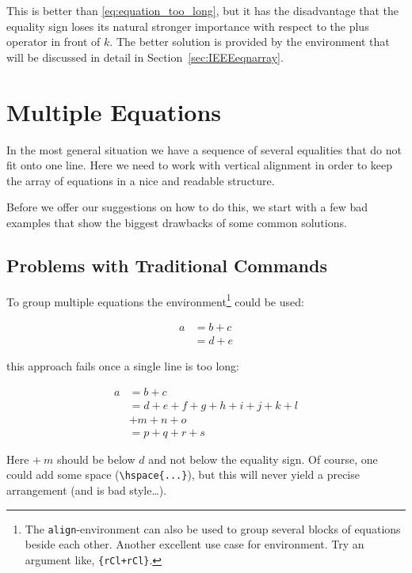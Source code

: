 This is better than \eqref{eq:equation_too_long}, but
it has the disadvantage that the equality sign loses its natural
stronger importance with respect to the plus operator in front of
$k$. The better solution is provided by the
 environment that will be discussed in detail in
Section~\ref{sec:IEEEeqnarray}.

\section{Multiple Equations}
\label{sec:IEEEeqnarray}

In the most general situation we have a sequence of several
equalities that do not fit onto one line. Here we need to work with
vertical alignment in order to keep the array of equations in a nice
and readable structure.

Before we offer our suggestions on how to do this, we start with a few
bad examples that show the biggest drawbacks of some common solutions.


\subsection{Problems with Traditional Commands}
\label{sec:problems_traditional}

To group multiple equations the
 environment\footnote{The \texttt{align}-environment can
  also be used to group several blocks of equations beside each other.
  Another excellent use case for
   environment. Try an argument like,
  \texttt{\{rCl+rCl\}}.} could be used:
\begin{example}
\begin{align}
  a & = b + c \\
  & = d + e
\end{align}
\end{example}

this approach fails once a single line is too long:
\begin{example}
\begin{align}
  a & = b + c \\
  & = d + e + f + g + h + i 
  + j + k + l \nonumber \\
  & + m + n + o \\
  & = p + q + r + s
\end{align}
\end{example}
\noindent
Here $+\:m$ should be below $d$ and not below the equality sign. Of
course, one could add some space (\verb+\hspace{...}+),
but this will never yield a precise arrangement (and is bad
style\ldots).

